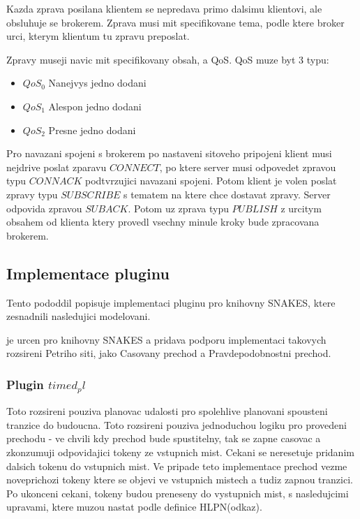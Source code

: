 Kazda zprava posilana klientem se nepredava primo dalsimu klientovi, ale obsluhuje se brokerem. Zprava musi mit specifikovane tema, podle ktere broker urci, kterym klientum tu zpravu preposlat.

Zpravy museji navic mit specifikovany obsah, a QoS. QoS muze byt 3 typu:
\begin{itemize}
  \item $QoS_0$ Nanejvys jedno dodani \\
  \item $QoS_1$ Alespon jedno dodani \\
  \item $QoS_2$ Presne jedno dodani 
\end{itemize}

Pro navazani spojeni s brokerem po nastaveni sitoveho pripojeni klient musi nejdrive poslat zparavu $CONNECT$, po ktere server musi odpovedet zpravou typu $CONNACK$ podtvrzujici navazani spojeni. Potom klient je volen poslat zpravy typu $SUBSCRIBE$ s tematem na ktere chce dostavat zpravy. Server odpovida zpravou $SUBACK$. Potom uz zprava typu $PUBLISH$ z urcitym obsahem od klienta ktery provedl vsechny minule kroky bude zpracovana brokerem.

\subsection{Implementace pluginu}
Tento pododdil popisuje implementaci pluginu pro knihovny SNAKES, ktere zesnadnili nasledujici modelovani.

je urcen pro knihovny SNAKES a pridava podporu implementaci takovych rozsireni Petriho siti, jako Casovany prechod a Pravdepodobnostni prechod.

\subsubsection{Plugin $timed_pl$}
Toto rozsireni pouziva planovac udalosti pro spolehlive planovani spousteni tranzice do budoucna. Toto rozsireni pouziva jednoduchou logiku pro provedeni prechodu - ve chvili kdy prechod bude spustitelny, tak se zapne casovac a zkonzumuji odpovidajici tokeny ze vstupnich mist. Cekani se neresetuje pridanim dalsich tokenu do vstupnich mist. Ve pripade teto implementace prechod vezme noveprichozi tokeny ktere se objevi ve vstupnich mistech a tudiz zapnou tranzici. Po ukonceni cekani, tokeny budou preneseny do vystupnich mist, s nasledujcimi upravami, ktere muzou nastat podle definice HLPN(odkaz).

